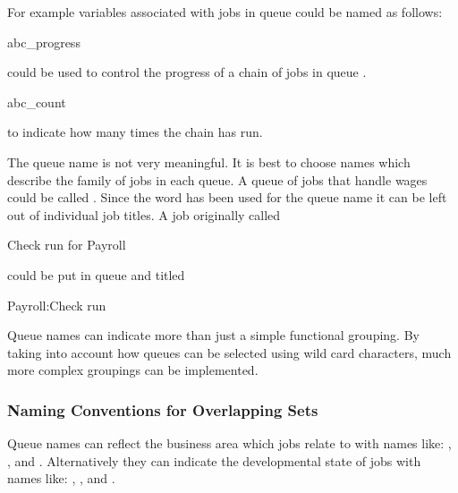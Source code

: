 For example variables associated with jobs in queue  could be named as follows:

\begin{expara}

abc\_progress

\end{expara}

could be used to control the progress of a chain of jobs in queue .

\begin{expara}

abc\_count

\end{expara}

to indicate how many times the chain has run.

The queue name  is not very meaningful. It is best to choose names which describe the family of jobs in each queue. A
queue of jobs that handle wages could be called . Since the word  has been used for the queue name it can
be left out of individual job titles. A job originally called

\begin{expara}

Check run for Payroll

\end{expara}

could be put in queue  and titled

\begin{expara}

Payroll:Check run

\end{expara}

Queue names can indicate more than just a simple functional grouping. By taking into account how queues can be selected using wild card
characters, much more complex groupings can be implemented.

\subsubsection{Naming Conventions for Overlapping Sets}
Queue names can reflect the business area which jobs relate to with names like: , ,
and . Alternatively they can indicate the developmental state of jobs with names like:
, , and .

